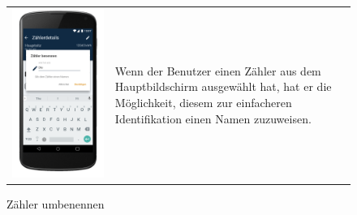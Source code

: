 \begin{figure}[h]
\begin{tabularx}{\textwidth}{X  X}
	\includegraphics[scale = 0.155]{img/AndroidMockup/rename} \caption{Zähler umbenennen} & Wenn der Benutzer einen Zähler aus dem Hauptbildschirm ausgewählt hat, hat er die Möglichkeit, diesem zur einfacheren Identifikation einen Namen zuzuweisen. \\
\end{tabularx}
\end{figure}


